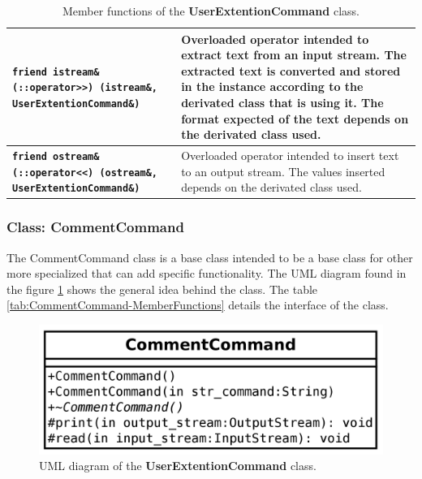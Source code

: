 \documentclass[11pt,twoside,openany,x11names,svgnames]{memoir}
\begin{document}
\begin{table}[h]
\begin{tabular}{| >{\bfseries}p{8.5cm} | p{7cm} |}
	\hline
	
	\texttt{friend istream\& (::operator>>) (istream\&, UserExtentionCommand\&)} & Overloaded operator intended to extract text from an input stream. The extracted text is converted and stored in the instance according to the derivated class that is using it. The format expected of the text depends on the derivated class used. \\
	
	\hline
	
	\texttt{friend ostream\& (::operator<<) (ostream\&, UserExtentionCommand\&)} & Overloaded operator intended to insert text to an output stream. The values inserted depends on the derivated class used. \\	
	
	\hline
\end{tabular}
\caption{Member functions of the \textbf{UserExtentionCommand} class.}
\label{tab:UserExtentionCommand-MemberFunctions}
\end{table}

\clearpage

\subsubsection{Class: CommentCommand}\label{Class-CommentCommand}

The CommentCommand class is a base class intended to be a base class for other more specialized that can add specific functionality. The UML diagram found in the figure \ref{fig:class-comment-command} shows the general idea behind the class. The table \ref{tab:CommentCommand-MemberFunctions} details the interface of the class.

\begin{figure}
	\centering
	\includegraphics[scale=0.2, clip=true, trim= 0pt 0pt 0pt 0pt]{images/chapter03-image32}
	\caption{UML diagram of the \textbf{UserExtentionCommand} class.}
	\label{fig:class-comment-command}
\end{figure}
\end{document}
